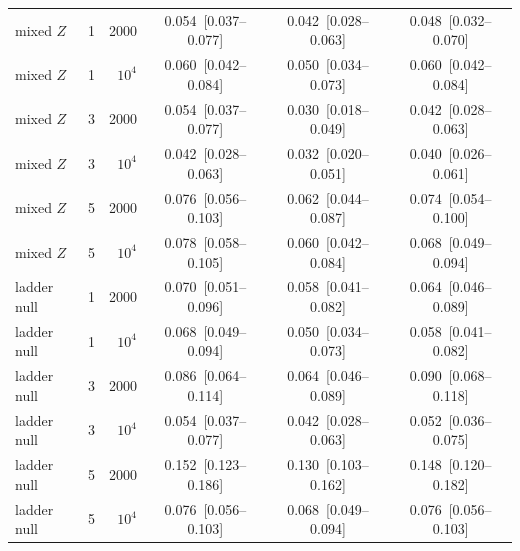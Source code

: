{\begin{tabular}{llrccc}
mixed $Z$ & 1 & 2000 & 0.054~[0.037--0.077] & 0.042~[0.028--0.063] & 0.048~[0.032--0.070] \\
mixed $Z$ & 1 & $10^4$ & 0.060~[0.042--0.084] & 0.050~[0.034--0.073] & 0.060~[0.042--0.084] \\
mixed $Z$ & 3 & 2000 & 0.054~[0.037--0.077] & 0.030~[0.018--0.049] & 0.042~[0.028--0.063] \\
mixed $Z$ & 3 & $10^4$ & 0.042~[0.028--0.063] & 0.032~[0.020--0.051] & 0.040~[0.026--0.061] \\
mixed $Z$ & 5 & 2000 & 0.076~[0.056--0.103] & 0.062~[0.044--0.087] & 0.074~[0.054--0.100] \\
mixed $Z$ & 5 & $10^4$ & 0.078~[0.058--0.105] & 0.060~[0.042--0.084] & 0.068~[0.049--0.094] \\
ladder null & 1 & 2000 & 0.070~[0.051--0.096] & 0.058~[0.041--0.082] & 0.064~[0.046--0.089] \\
ladder null & 1 & $10^4$ & 0.068~[0.049--0.094] & 0.050~[0.034--0.073] & 0.058~[0.041--0.082] \\
ladder null & 3 & 2000 & 0.086~[0.064--0.114] & 0.064~[0.046--0.089] & 0.090~[0.068--0.118] \\
ladder null & 3 & $10^4$ & 0.054~[0.037--0.077] & 0.042~[0.028--0.063] & 0.052~[0.036--0.075] \\
ladder null & 5 & 2000 & 0.152~[0.123--0.186] & 0.130~[0.103--0.162] & 0.148~[0.120--0.182] \\
ladder null & 5 & $10^4$ & 0.076~[0.056--0.103] & 0.068~[0.049--0.094] & 0.076~[0.056--0.103] \\
\bottomrule
\end{tabular}}
